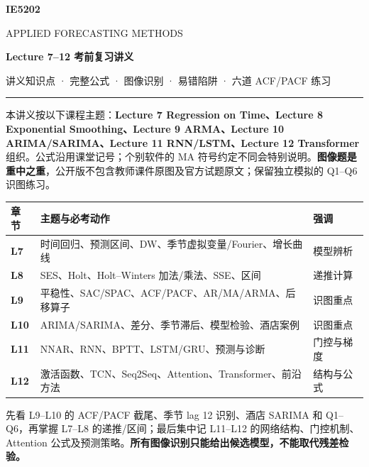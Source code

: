 \documentclass[UTF8,fontset=fandol,10.5pt,a4paper]{ctexart}
\begin{document}
\begin{center}
{\sffamily\bfseries\color{navy}\fontsize{24}{28}\selectfont IE5202}\par
\vspace{2mm}
{\Large APPLIED FORECASTING METHODS}\par\vspace{4mm}
{\huge\bfseries Lecture 7--12 考前复习讲义}\par\vspace{3mm}
{\small 讲义知识点 · 完整公式 · 图像识别 · 易错陷阱 · 六道 ACF/PACF 练习}\par
\vspace{3mm}\textcolor{graytext}{\rule{0.92\linewidth}{0.6pt}}\par
\end{center}
\begin{keybox}[title={使用说明 / Reading Guide}]
本讲义按以下课程主题：\textbf{Lecture 7 Regression on Time、Lecture 8 Exponential Smoothing、Lecture 9 ARMA、Lecture 10 ARIMA/SARIMA、Lecture 11 RNN/LSTM、Lecture 12 Transformer} 组织。公式沿用课堂记号；个别软件的 MA 符号约定不同会特别说明。\textbf{图像题是重中之重}，公开版不包含教师课件原图及官方试题原文；保留独立模拟的 Q1--Q6 识图练习。
\end{keybox}
\begin{center}
\begin{tabularx}{0.96\linewidth}{>{\bfseries}l X l}
\toprule
章节 & 主题与必考动作 & 强调 \tabularnewline\midrule
L7 & 时间回归、预测区间、DW、季节虚拟变量/Fourier、增长曲线 & 模型辨析 \\
L8 & SES、Holt、Holt--Winters 加法/乘法、SSE、区间 & 递推计算 \\
L9 & 平稳性、SAC/SPAC、ACF/PACF、AR/MA/ARMA、后移算子 & \textcolor{brick}{识图重点} \\
L10 & ARIMA/SARIMA、差分、季节滞后、模型检验、酒店案例 & \textcolor{brick}{识图重点} \\
L11 & NNAR、RNN、BPTT、LSTM/GRU、预测与诊断 & 门控与梯度 \\
L12 & 激活函数、TCN、Seq2Seq、Attention、Transformer、前沿方法 & 结构与公式 \\
\bottomrule
\end{tabularx}
\end{center}
\vspace{3mm}
\begin{exam}[title={考前最优学习顺序}]
先看 L9--L10 的 ACF/PACF 截尾、季节 lag 12 识别、酒店 SARIMA 和 Q1--Q6，再掌握 L7--L8 的递推/区间；最后集中记 L11--L12 的网络结构、门控机制、Attention 公式及预测策略。\textbf{所有图像识别只能给出候选模型，不能取代残差检验。}
\end{exam}
\tableofcontents
\clearpage
\end{document}
